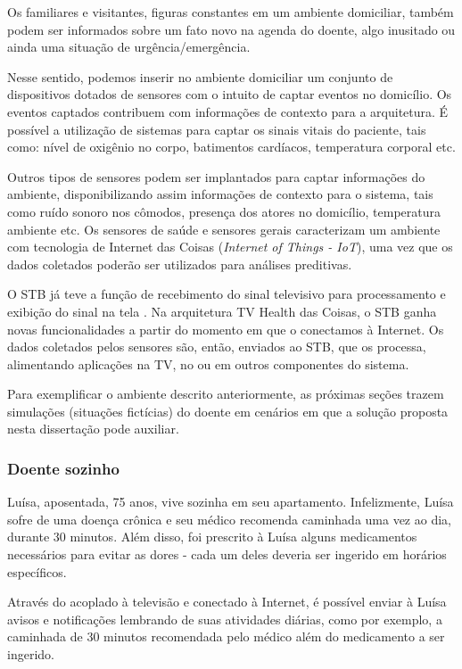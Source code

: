 Os familiares e visitantes, figuras constantes em um ambiente domiciliar, também
podem ser informados sobre um fato novo na agenda do doente, algo inusitado ou 
ainda uma situação de urgência/emergência.

Nesse sentido, podemos inserir no ambiente domiciliar um conjunto de
dispositivos dotados de sensores com o intuito de captar eventos no domicílio. 
Os eventos captados contribuem com informações de contexto para a arquitetura.
É possível a utilização de sistemas para captar os sinais vitais do paciente, tais
como: nível de oxigênio no corpo, batimentos cardíacos, temperatura corporal etc.

Outros tipos de sensores podem ser implantados para captar informações do
ambiente, disponibilizando assim informações de contexto para o sistema,  tais
como ruído sonoro nos cômodos, presença dos atores no domicílio, temperatura
ambiente etc. Os sensores de saúde e sensores gerais caracterizam um ambiente 
com tecnologia de Internet das Coisas (\textit{Internet of Things  - IoT}), uma
vez que os dados coletados poderão ser utilizados para análises preditivas.

O STB já teve a função de recebimento do sinal televisivo para processamento e
exibição do sinal na tela \cite{projetometal}. Na arquitetura TV Health das
Coisas, o STB ganha novas funcionalidades a partir do momento em que o
conectamos à Internet. Os dados coletados pelos sensores são, então, enviados
ao STB, que os processa, alimentando aplicações na TV, no \smartphone[] ou em
outros componentes do sistema.

Para exemplificar o ambiente descrito anteriormente, as próximas seções
trazem simulações (situações fictícias) do doente em cenários em que a solução
proposta nesta dissertação pode auxiliar.
\label{subsubsec:simulacoes-A}

\subsubsection{Doente sozinho}

Luísa, aposentada, 75 anos, vive sozinha em seu apartamento. Infelizmente,
Luísa sofre de uma doença crônica e seu médico recomenda caminhada uma vez ao
dia, durante 30 minutos.  Além disso, foi prescrito à Luísa alguns medicamentos
necessários para evitar as dores - cada um deles deveria ser ingerido em
horários específicos.

Através do \stb[] acoplado à televisão e conectado à Internet, é
possível enviar à Luísa avisos e notificações lembrando de suas atividades
diárias, como por exemplo, a caminhada de 30 minutos recomendada pelo
médico além do medicamento a ser ingerido.

